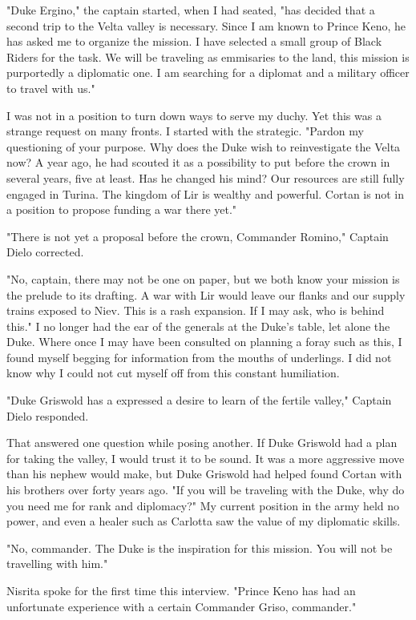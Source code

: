 \documentclass{article}
\begin{document}
"Duke Ergino," the captain started, when I had seated, "has decided that a second trip to the Velta valley is necessary. Since I am known to Prince Keno, he has asked me to organize the mission. I have selected a small group of Black Riders for the task. We will be traveling as emmisaries to the land, this mission is purportedly a diplomatic one. I am searching for a diplomat and a military officer to travel with us."

I was not in a position to turn down ways to serve my duchy. Yet this was a strange request on many fronts. I started with the strategic. "Pardon my questioning of your purpose. Why does the Duke wish to reinvestigate the Velta now? A year ago, he had scouted it as a possibility to put before the crown in several years, five at least. Has he changed his mind? Our resources are still fully engaged in Turina. The kingdom of Lir is wealthy and powerful. Cortan is not in a position to propose funding a war there yet."

"There is not yet a proposal before the crown, Commander Romino," Captain Dielo corrected.

"No, captain, there may not be one on paper, but we both know your mission is the prelude to its drafting. A war with Lir would leave our flanks and our supply trains exposed to Niev. This is a rash expansion. If I may ask, who is behind this." I no longer had the ear of the generals at the Duke's table, let alone the Duke. Where once I may have been consulted on planning a foray such as this, I found myself begging for information from the mouths of underlings. I did not know why I could not cut myself off from this constant humiliation.

"Duke Griswold has a expressed a desire to learn of the fertile valley," Captain Dielo responded.

That answered one question while posing another. If Duke Griswold had a plan for taking the valley, I would trust it to be sound. It was a more aggressive move than his nephew would make, but Duke Griswold had helped found Cortan with his brothers over forty years ago. "If you will be traveling with the Duke, why do you need me for rank and diplomacy?" My current position in the army held no power, and even a healer such as Carlotta saw the value of my diplomatic skills.

"No, commander. The Duke is the inspiration for this mission. You will not be travelling with him."

Nisrita spoke for the first time this interview. "Prince Keno has had an unfortunate experience with a certain Commander Griso, commander."
\end{document}
